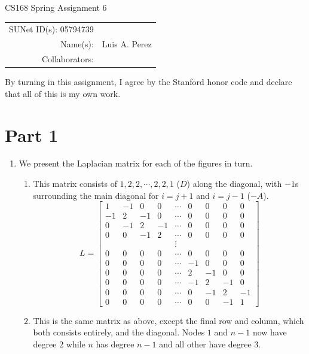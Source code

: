 \documentclass[12pt]{article}
\begin{document}
\begin{center}
{\Large CS168 Spring Assignment 6}

\begin{tabular}{rl}
SUNet ID(s): 05794739 & \\
Name(s): & Luis A. Perez \\
Collaborators: &
\end{tabular}
\end{center}

By turning in this assignment, I agree by the Stanford honor code and declare
that all of this is my own work.

\section*{Part 1}

\begin{enumerate}[label=(\alph*)]
  \item We present the Laplacian matrix for each of the figures in turn.

    \begin{enumerate}[label=(\alph*)]
      \item
        This matrix consists of $1, 2, 2, \cdots, 2, 2, 1$ ($D$) along the diagonal, with $-1$s surrounding the main diagonal for $i = j + 1$ and $i = j - 1$ ($-A$).
        \[
          L = \begin{bmatrix}
            1 & -1 & 0 & 0 & \cdots & 0 & 0 & 0 & 0 \\
            -1 & 2 & -1 & 0 & \cdots & 0 & 0 & 0 & 0 \\
            0 & -1 & 2 & -1 & \cdots & 0 & 0 & 0 & 0 \\
            0 & 0 & -1 & 2 & \cdots & 0 & 0 & 0 & 0 \\
              &   &   &   & \vdots &   &   &   &   \\
            0 & 0 & 0 & 0 & \cdots & 0 & 0 & 0 & 0  \\
            0 & 0 & 0 & 0 & \cdots & -1 & 0 & 0 & 0  \\
            0 & 0 & 0 & 0 & \cdots & 2 & -1 & 0 & 0  \\
            0 & 0 & 0 & 0 & \cdots & -1 & 2 & -1 & 0  \\
            0 & 0 & 0 & 0 & \cdots & 0 & -1 & 2 & -1  \\
            0 & 0 & 0 & 0 & \cdots & 0 & 0 & -1 & 1
          \end{bmatrix}
        \]
      \item
        This is the same matrix as above, except the final row and column, which both consists entirely, and the diagonal. Nodes $1$ and $n-1$ now have degree $2$ while $n$ has degree $n-1$ and all other have degree $3$.


\end{enumerate}
\end{enumerate}
\end{document}
